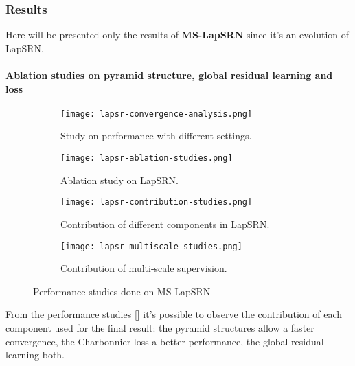 \subsubsection{Results}

Here will be presented only the results of \textbf{MS-LapSRN}\cite{MSLapSRN} since it's an evolution of LapSRN.

\paragraph{Ablation studies on pyramid structure, global residual learning and loss}
\begin{figure}[h]
    \begin{subfigure}{0.49\textwidth}
        \centering
        \texttt{[image: lapsr-convergence-analysis.png]}
        \caption{Study on performance with different settings.}
    \end{subfigure}
    \begin{subfigure}{0.49\textwidth}
        \centering
        \texttt{[image: lapsr-ablation-studies.png]}
        \caption{Ablation study on LapSRN.}
    \end{subfigure}
    \begin{subfigure}{0.49\textwidth}
        \centering
        \texttt{[image: lapsr-contribution-studies.png]}
        \caption{Contribution of different components in LapSRN.}
    \end{subfigure}
    \begin{subfigure}{0.49\textwidth}
        \centering
        \texttt{[image: lapsr-multiscale-studies.png]}
        \caption{Contribution of multi-scale supervision.}
    \end{subfigure}
    \caption{Performance studies done on MS-LapSRN}\label{lapsr:performance-studies}
\end{figure}

From the performance studies [] it's possible to observe the contribution of each component used for the final result: the pyramid structures allow a faster convergence, the Charbonnier loss a better performance, the global residual learning both.

